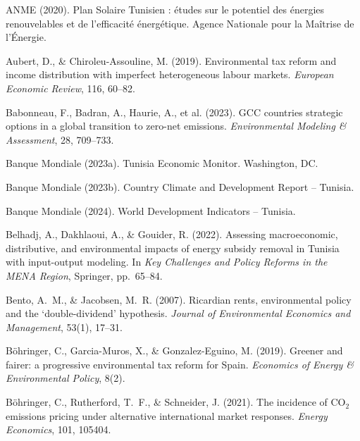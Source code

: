 \documentclass[12pt, a4paper]{article}
\begin{document}
\begin{enumerate}[label={[\arabic*]}, leftmargin=*]

\item ANME (2020). Plan Solaire Tunisien : études sur le potentiel des énergies renouvelables et de l'efficacité énergétique. Agence Nationale pour la Maîtrise de l'Énergie.

\item Aubert, D., \& Chiroleu-Assouline, M. (2019). Environmental tax reform and income distribution with imperfect heterogeneous labour markets. \textit{European Economic Review}, 116, 60--82.

\item Babonneau, F., Badran, A., Haurie, A., et al. (2023). GCC countries strategic options in a global transition to zero-net emissions. \textit{Environmental Modeling \& Assessment}, 28, 709--733.

\item Banque Mondiale (2023a). Tunisia Economic Monitor. Washington, DC.

\item Banque Mondiale (2023b). Country Climate and Development Report -- Tunisia.

\item Banque Mondiale (2024). World Development Indicators -- Tunisia.

\item Belhadj, A., Dakhlaoui, A., \& Gouider, R. (2022). Assessing macroeconomic, distributive, and environmental impacts of energy subsidy removal in Tunisia with input-output modeling. In \textit{Key Challenges and Policy Reforms in the MENA Region}, Springer, pp.~65--84.

\item Bento, A.~M., \& Jacobsen, M.~R. (2007). Ricardian rents, environmental policy and the `double-dividend' hypothesis. \textit{Journal of Environmental Economics and Management}, 53(1), 17--31.

\item Böhringer, C., Garcia-Muros, X., \& Gonzalez-Eguino, M. (2019). Greener and fairer: a progressive environmental tax reform for Spain. \textit{Economics of Energy \& Environmental Policy}, 8(2).

\item Böhringer, C., Rutherford, T.~F., \& Schneider, J. (2021). The incidence of CO$_2$ emissions pricing under alternative international market responses. \textit{Energy Economics}, 101, 105404.


\end{enumerate}
\end{document}
